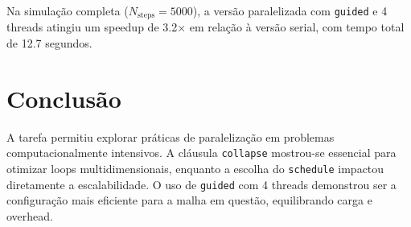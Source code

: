 \documentclass[a4paper, 12pt]{article}
\begin{document}
	Na simulação completa (\( N_{\text{steps}} = 5000 \)), a versão paralelizada com \texttt{guided} e 4 threads atingiu um speedup de 3.2× em relação à versão serial, com tempo total de 12.7 segundos.  
	
	\section{Conclusão}  
	\hspace{.62cm}A tarefa permitiu explorar práticas de paralelização em problemas computacionalmente intensivos. A cláusula \texttt{collapse} mostrou-se essencial para otimizar loops multidimensionais, enquanto a escolha do \texttt{schedule} impactou diretamente a escalabilidade. O uso de \texttt{guided} com 4 threads demonstrou ser a configuração mais eficiente para a malha em questão, equilibrando carga e overhead.  
	
\end{document}
